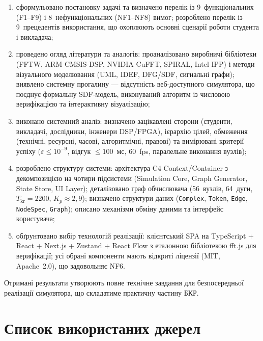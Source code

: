 \documentclass[14pt,a4paper]{extarticle}
\begin{document}
\begin{enumerate}
  \item сформульовано постановку задачі та визначено перелік із
        9~функціональних (F1--F9) і 8~нефункціональних
        (NF1--NF8) вимог; розроблено перелік із 9~прецедентів
        використання, що охоплюють основні сценарії роботи студента
        і викладача;
  \item проведено огляд літератури та аналогів: проаналізовано
        виробничі бібліотеки (FFTW, ARM CMSIS-DSP, NVIDIA CuFFT,
        SPIRAL, Intel IPP) і методи візуального моделювання
        (UML, IDEF, DFG/SDF, сигнальні графи); виявлено системну
        прогалину --- відсутність веб-доступного симулятора, що
        поєднує формальну SDF-модель, виконуваний алгоритм із
        числовою верифікацією та інтерактивну візуалізацію;
  \item виконано системний аналіз: визначено зацікавлені сторони
        (студенти, викладачі, дослідники, інженери DSP/FPGA),
        ієрархію цілей, обмеження (технічні, ресурсні, часові,
        алгоритмічні, правові) та вимірювані критерії успіху
        ($\varepsilon \le 10^{-9}$, відгук $\le 100$~мс, 60~fps,
        паралельне виконання вузлів);
  \item розроблено структуру системи: архітектура C4 Context/Container
        з декомпозицією на чотири підсистеми (Simulation Core, Graph
        Generator, State Store, UI Layer); деталізовано граф
        обчислювача (56~вузлів, 64~дуги, $T_{\mathrm{kr}} = 2200$,
        $K_p \approx 2{,}9$); визначено структури даних
        (\texttt{Complex}, \texttt{Token}, \texttt{Edge},
        \texttt{NodeSpec}, \texttt{Graph}); описано механізми обміну
        даними та інтерфейс користувача;
  \item обґрунтовано вибір технологій реалізації: клієнтський SPA на
        TypeScript + React + Next.js + Zustand + React Flow з
        еталонною бібліотекою fft.js для верифікації; усі обрані
        компоненти мають відкриті ліцензії (MIT, Apache~2.0), що
        задовольняє NF6.
\end{enumerate}

Отримані результати утворюють повне технічне завдання для
безпосередньої реалізації симулятора, що складатиме практичну
частину БКР.

\section*{Список використаних джерел}
\end{document}
